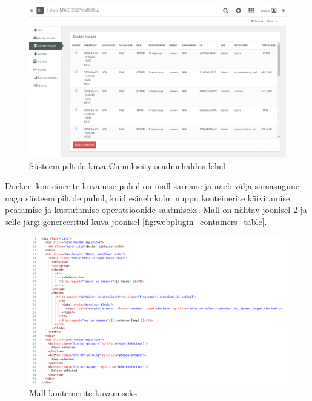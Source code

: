 \documentclass[12pt]{article}
\begin{document}
  \FloatBarrier
 
  \begin{figure} [ht] %
  \begin{center}
  \includegraphics[width=1\textwidth]{webplugin_images}
  \caption{Süsteemipiltide kuva Cumulocity seadmehaldus lehel}
  \label{fig:webplugin_images}
  \end{center}
  \end{figure}
  
  \FloatBarrier
  
  Dockeri konteinerite kuvamise puhul on mall sarnane ja näeb välja samasugune
  nagu süsteemipiltide puhul, kuid esineb kolm nuppu
  konteinerite käivitamise, peatamise ja kustutamise operatsioonide saatmiseks. 
  Mall on nähtav joonisel \ref{fig:webplugin_containers_table_template} ja selle järgi
  genereeritud kuva joonisel \ref{fig:webplugin_containers_table}.
 
  
  \begin{figure} [ht] %
  \begin{center}
  \includegraphics[width=1\textwidth]{webplugin_containers_table_template}
  \caption{Mall konteinerite kuvamiseks}
  \label{fig:webplugin_containers_table_template}
  \end{center}
  \end{figure}
  
\end{document}
